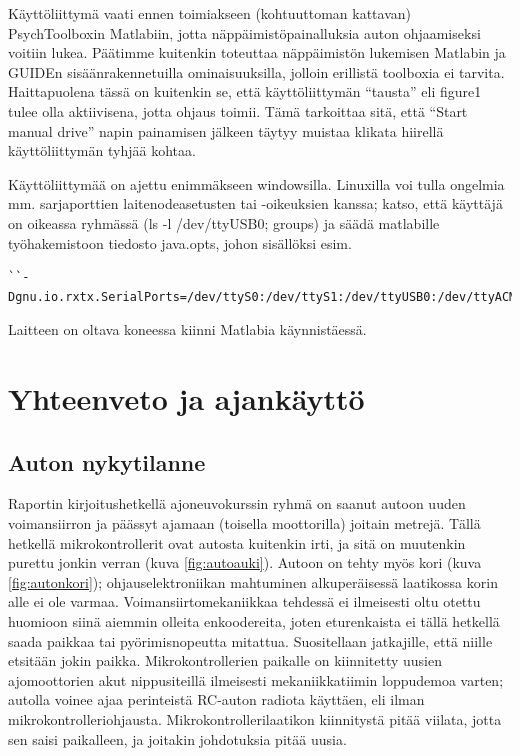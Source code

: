 \documentclass{article}
\begin{document}
Käyttöliittymä vaati ennen toimiakseen (kohtuuttoman kattavan) PsychToolboxin Matlabiin, jotta näppäimistöpainalluksia auton ohjaamiseksi voitiin lukea. Päätimme kuitenkin toteuttaa näppäimistön lukemisen Matlabin ja GUIDEn sisäänrakennetuilla ominaisuuksilla, jolloin erillistä toolboxia ei tarvita. Haittapuolena tässä on kuitenkin se, että käyttöliittymän ``tausta'' eli figure1 tulee olla aktiivisena, jotta ohjaus toimii. Tämä tarkoittaa sitä, että ``Start manual drive'' napin painamisen jälkeen täytyy muistaa klikata hiirellä käyttöliittymän tyhjää kohtaa.

Käyttöliittymää on ajettu enimmäkseen windowsilla. Linuxilla voi tulla ongelmia mm. sarjaporttien laitenodeasetusten tai -oikeuksien kanssa; katso, että käyttäjä on oikeassa ryhmässä (ls -l /dev/ttyUSB0; groups) ja säädä matlabille työhakemistoon tiedosto java.opts, johon sisällöksi esim.
\begin{verbatim}
``-Dgnu.io.rxtx.SerialPorts=/dev/ttyS0:/dev/ttyS1:/dev/ttyUSB0:/dev/ttyACM0''.
\end{verbatim}

Laitteen on oltava koneessa kiinni Matlabia käynnistäessä.

\section{Yhteenveto ja ajankäyttö}

\subsection{Auton nykytilanne}
Raportin kirjoitushetkellä ajoneuvokurssin ryhmä on saanut autoon uuden voimansiirron ja päässyt ajamaan (toisella moottorilla) joitain metrejä. Tällä hetkellä mikrokontrollerit ovat autosta kuitenkin irti, ja sitä on muutenkin purettu jonkin verran (kuva \ref{fig:autoauki}). Autoon on tehty myös kori (kuva \ref{fig:autonkori}); ohjauselektroniikan mahtuminen alkuperäisessä laatikossa korin alle ei ole varmaa. Voimansiirtomekaniikkaa tehdessä ei ilmeisesti oltu otettu huomioon siinä aiemmin olleita enkoodereita, joten eturenkaista ei tällä hetkellä saada paikkaa tai pyörimisnopeutta mitattua. Suositellaan jatkajille, että niille etsitään jokin paikka. Mikrokontrollerien paikalle on kiinnitetty uusien ajomoottorien akut nippusiteillä ilmeisesti mekaniikkatiimin loppudemoa varten; autolla voinee ajaa perinteistä RC-auton radiota käyttäen, eli ilman mikrokontrolleriohjausta. Mikrokontrollerilaatikon kiinnitystä pitää viilata, jotta sen saisi paikalleen, ja joitakin johdotuksia pitää uusia.
\end{document}
